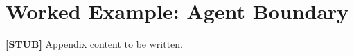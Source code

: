 \chapter{Worked Example: Agent Boundary}
\label{appb-worked-example-agent-boundary}

\textbf{[STUB]} Appendix content to be written.
